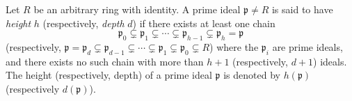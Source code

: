 Let $R$ be an arbitrary ring with identity. A prime ideal $\mathfrak{p} \neq R$ is said to have \textit{height} $h$ (respectively, \textit{depth} $d$) if there exists at least one chain
$$\mathfrak{p}_0 \subsetneq \mathfrak{p}_1 \subsetneq \cdots \subsetneq \mathfrak{p}_{h-1} \subsetneq \mathfrak{p}_h = \mathfrak{p}$$
(respectively, $\mathfrak{p} = \mathfrak{p}_d \subsetneq \mathfrak{p}_{d-1} \subsetneq \cdots \subsetneq \mathfrak{p}_1 \subsetneq \mathfrak{p}_0 \subsetneq R$)
where the $\mathfrak{p}_i$ are prime ideals, and there exists no such chain with more than $h + 1$ (respectively, $d + 1$) ideals. The height (respectively, depth) of a prime ideal $\mathfrak{p}$ is denoted by $h(\mathfrak{p})$ (respectively $d(\mathfrak{p})$).
